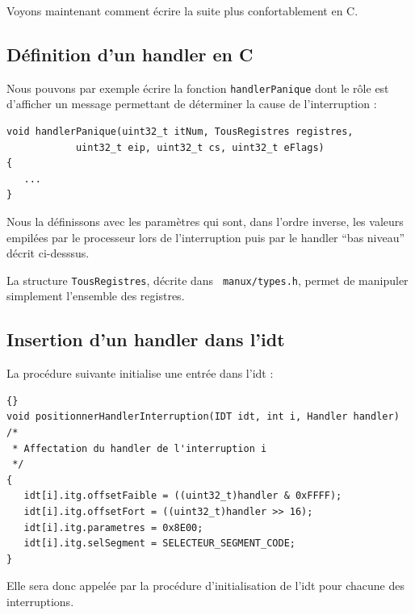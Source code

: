 \begin{itemize}
   Voyons maintenant comment écrire la suite plus confortablement en
C.
   
%      
\subsection{Définition d'un handler en C}

   Nous pouvons par exemple écrire la fonction
\lstinline!handlerPanique! dont le rôle est d'afficher un message
permettant de déterminer la cause de l'interruption :

\begin{lstlisting}
void handlerPanique(uint32_t itNum, TousRegistres registres,
		    uint32_t eip, uint32_t cs, uint32_t eFlags)
{
   ...
}
\end{lstlisting}

   Nous la définissons avec les paramètres qui sont, dans l'ordre
inverse, les valeurs empilées par le processeur lors de l'interruption
puis par le handler ``bas niveau'' décrit ci-desssus.

   La structure \lstinline!TousRegistres!, décrite dans {\tt
manux/types.h}, permet de manipuler simplement l'ensemble des
registres.
   
%      
\subsection{Insertion d'un handler dans l'{\sc idt}}

   La procédure suivante initialise une entrée dans l'{\sc idt} :

\begin{lstlisting}{}
void positionnerHandlerInterruption(IDT idt, int i, Handler handler)
/*
 * Affectation du handler de l'interruption i
 */
{
   idt[i].itg.offsetFaible = ((uint32_t)handler & 0xFFFF);
   idt[i].itg.offsetFort = ((uint32_t)handler >> 16);
   idt[i].itg.parametres = 0x8E00;
   idt[i].itg.selSegment = SELECTEUR_SEGMENT_CODE;
}

\end{lstlisting}

   Elle sera donc appelée par la procédure d'initialisation de l'{\sc idt} pour
chacune des interruptions.


\end{itemize}

